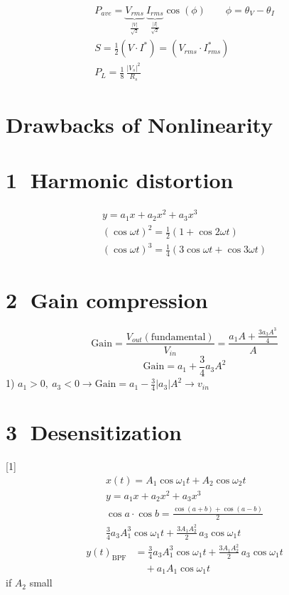 \documentclass[11pt,a4paper]{article}
\begin{document}

\begin{gather*}
P_{ave} = \underbrace{V_{rms}}_{\frac{|V|}{\sqrt{2}}}\ \underbrace{I_{rms}}_{\frac{|I|}{\sqrt{2}}}\cos(\phi) \qquad \phi=\theta_V-\theta_I\\
S = \frac{1}{2}(V\cdot I^{*}) = (V_{rms}\cdot I_{rms}^{*})\\
P_L = \frac{1}{8}\,\frac{|V_s|^2}{R_s}
\end{gather*}

\section{Drawbacks of Nonlinearity}
\section{\textcircled{1} Harmonic distortion}
\begin{gather*}
y = a_1x + a_2x^2 + a_3x^3\\
(\cos\omega t)^2 = \frac{1}{2}(1+\cos 2\omega t)\\
(\cos\omega t)^3 = \frac{1}{4}(3\cos\omega t+\cos 3\omega t)
\end{gather*}

\section{\textcircled{2} Gain compression}
\[ \mathrm{Gain} = \frac{V_{out}(\text{fundamental})}{V_{in}} = \frac{a_1A+\frac{3a_3A^3}{4}}{A} \]
\[ \mathrm{Gain} = a_1+\frac{3}{4}a_3A^2 \]
1) $a_1>0,\ a_3<0 \to \mathrm{Gain}=a_1-\frac{3}{4}|a_3|A^2 \to v_{in}$

\section{\textcircled{3} Desensitization}
[1]
\begin{gather*}
x(t) = A_1\cos\omega_1 t + A_2\cos\omega_2 t\\
y = a_1x+a_2x^2+a_3x^3\\
\cos a\cdot\cos b = \frac{\cos(a+b)+\cos(a-b)}{2}\\
\frac{3}{4}a_3A_1^3\cos\omega_1 t + \frac{3A_1A_2^2}{2}\,a_3\cos\omega_1 t
\end{gather*}
\begin{align*}
y(t)_{\mathrm{BPF}} &= \frac{3}{4}a_3A_1^3\cos\omega_1 t + \frac{3A_1A_2^2}{2}\,a_3\cos\omega_1 t\\
&\quad + a_1A_1\cos\omega_1 t
\end{align*}
if $A_2$ small
\end{document}
